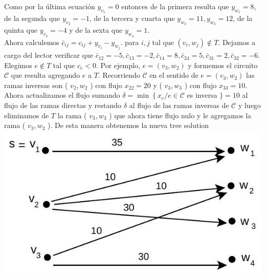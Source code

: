 \documentclass[10pt]{article}
\begin{document}
Como por la última ecuación $y_{v_{1}}=0$ entonces de la primera resulta que $y_{w_{1}}=8$, de la segunda que $y_{v_{2}}=-1$, de la tercera y cuarta que $y_{w_{2}}=11, y_{w_{3}}=12$, de la quinta que $y_{v_{3}}=-4$ y de la sexta que $y_{w_{4}}=1$.\\
Ahora calculemos $\bar{c}_{i j}=c_{i j}+y_{v_{i}}-y_{w_{j}}$. para $i, j$ tal que $\left(v_{i}, w_{j}\right) \notin T$. Dejamos a cargo del lector verificar que $\bar{c}_{12}=-5, \bar{c}_{13}=-2, \bar{c}_{14}=8, \bar{c}_{24}=5, \bar{c}_{31}=2, \bar{c}_{32}=-6$.\\
Elegimos $e \notin T$ tal que $c_{e}<0$. Por ejemplo, $e=\left(v_{3}, w_{2}\right)$ y formemos el circuito $\mathcal{C}$ que resulta agregando $e$ a $T$. Recorriendo $\mathcal{C}$ en el sentido de $e=\left(v_{3}, w_{2}\right)$ las ramas inversas son ( $v_{2}, w_{2}$ ) con flujo $x_{22}=20$ y ( $v_{3}, w_{3}$ ) con flujo $x_{33}=10$. Ahora actualizamos el flujo sumando $\delta=\min \left\{x_{e} / e \in \mathcal{C}\right.$ es inversa $\}=10$ al flujo de las ramas directas y restando $\delta$ al flujo de las ramas inversas de $\mathcal{C}$ y luego eliminamos de $T$ la rama ( $v_{3}, w_{3}$ ) que ahora tiene flujo nulo y le agregamos la rama ( $v_{3}, w_{2}$ ). De esta manera obtenemos la nueva tree solution\\
\includegraphics[max width=\textwidth, center]{2025_09_05_955b52bfc43174a24a9ag-31}
\end{document}
